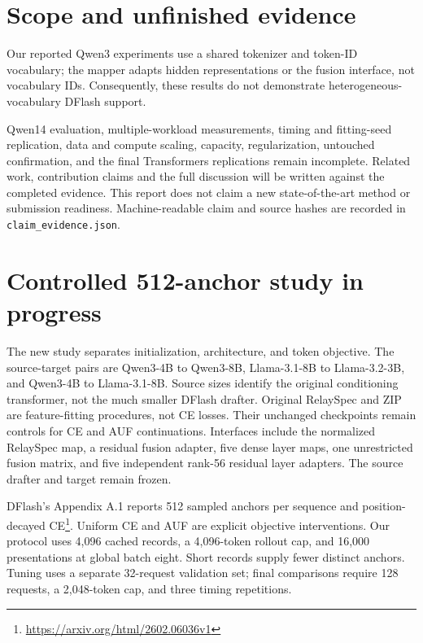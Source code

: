 \documentclass{article}
\begin{document}
\section{Scope and unfinished evidence}
Our reported Qwen3 experiments use a shared tokenizer and token-ID
vocabulary; the mapper adapts hidden representations or the fusion
interface, not vocabulary IDs. Consequently, these results do not
demonstrate heterogeneous-vocabulary DFlash support.

Qwen14 evaluation, multiple-workload measurements, timing and fitting-seed
replication, data and compute scaling, capacity, regularization, untouched
confirmation, and the final Transformers replications remain incomplete.
Related work, contribution claims and the full discussion will be written
against the completed evidence. This report does not claim a new
state-of-the-art method or submission readiness. Machine-readable claim
and source hashes are recorded in \texttt{claim\_evidence.json}.

\section{Controlled 512-anchor study in progress}
The new study separates initialization, architecture, and token objective.
The source-target pairs are Qwen3-4B to Qwen3-8B, Llama-3.1-8B to
Llama-3.2-3B, and Qwen3-4B to Llama-3.1-8B. Source sizes identify the
original conditioning transformer, not the much smaller DFlash drafter.
Original RelaySpec and ZIP are feature-fitting procedures, not CE losses.
Their unchanged checkpoints remain controls for CE and AUF continuations.
Interfaces include the normalized RelaySpec map, a residual fusion adapter,
five dense layer maps, one unrestricted fusion matrix, and five independent
rank-56 residual layer adapters. The source drafter and target remain frozen.

DFlash's Appendix A.1 reports 512 sampled anchors per sequence and
position-decayed CE\footnote{\url{https://arxiv.org/html/2602.06036v1}}.
Uniform CE and AUF are explicit objective interventions. Our protocol uses
4,096 cached records, a 4,096-token rollout cap, and 16,000 presentations at
global batch eight. Short records supply fewer distinct anchors. Tuning uses
a separate 32-request validation set; final comparisons require 128 requests,
a 2,048-token cap, and three timing repetitions.
\end{document}
